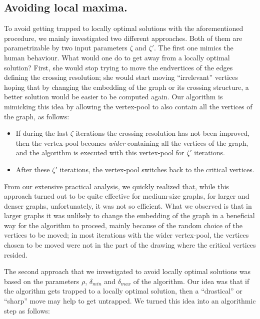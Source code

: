 \documentclass[runningheads]{llncs}
\begin{document}
\subsection{Avoiding local maxima.}
\label{ssec:maxima}

To avoid getting trapped to locally optimal solutions with the aforementioned procedure, we mainly investigated two different approaches. Both of them are parametrizable by two input parameters $\zeta$ and $\zeta'$. The first one mimics the human behaviour. What would one do to get away from a locally optimal solution? First, she would stop trying to move the endvertices of the edges defining the crossing resolution; she would start moving ``irrelevant'' vertices hoping that by changing the embedding of the graph or its crossing structure, a better solution would be easier to be computed again. Our algorithm is mimicking this idea by allowing the vertex-pool to also contain all the vertices of the graph, as follows: 

\begin{itemize}
\item If during the last $\zeta$ iterations the crossing resolution has not been improved, then the vertex-pool becomes \emph{wider} containing all the vertices of the graph, and the algorithm is executed with this vertex-pool for $\zeta'$ iterations. 
\item After these $\zeta'$ iterations, the vertex-pool switches back to the critical vertices.
\end{itemize}
%
From our extensive practical analysis, we quickly realized that, while this approach turned out to be quite effective for medium-size graphs, for larger and denser graphs, unfortunately, it was not so efficient. What we observed is that in larger graphs it was unlikely to change the embedding of the graph in a beneficial way for the algorithm to proceed, mainly because of the random choice of the vertices to be moved; in most iterations with the wider vertex-pool, the vertices chosen to be moved were not in the part of the drawing where the critical vertices resided.

The second approach that we investigated to avoid locally optimal solutions was based on the parameters $\rho$, $\delta_{min}$ and $\delta_{max}$ of the algorithm. Our idea was that if the algorithm gets trapped to a locally optimal solution, then a ``drastical'' or ``sharp'' move may help to get untrapped. We turned this idea into an algorithmic step as follows: 
\end{document}
